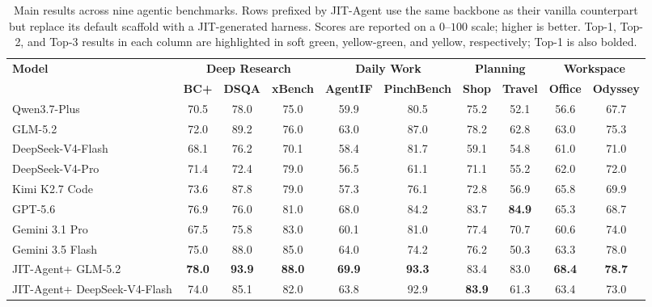\documentclass{article}
\newcommand{\ourmethod}{JIT-Agent\xspace}
\newcommand{\topone}[1]{\cellcolor{toponecell}\textbf{#1}}
\newcommand{\toptwo}[1]{\cellcolor{toptwocell}#1}
\newcommand{\topthree}[1]{\cellcolor{topthreecell}#1}
\begin{document}
\begin{table}[!t]
\centering
\setlength{\tabcolsep}{3.2pt}
\renewcommand{\arraystretch}{1.12}
\caption{Main results across nine agentic benchmarks. Rows prefixed by \ourmethod use the same backbone as their vanilla counterpart but replace its default scaffold with a JIT-generated harness. Scores are reported on a $0$--$100$ scale; higher is better. Top-1, Top-2, and Top-3 results in each column are highlighted in soft green, yellow-green, and yellow, respectively; Top-1 is also bolded.}
\label{tab:main_results_vanilla}
\begin{adjustbox}{max width=\textwidth}
\begin{tabular}{lccccccccc}
\toprule
\textbf{Model} & \multicolumn{3}{c}{\textbf{Deep Research}} & \multicolumn{2}{c}{\textbf{Daily Work}} & \multicolumn{2}{c}{\textbf{Planning}} & \multicolumn{2}{c}{\textbf{Workspace}} \\
\cmidrule(lr){2-4}\cmidrule(lr){5-6}\cmidrule(lr){7-8}\cmidrule(lr){9-10}
 & \textbf{BC+} & \textbf{DSQA} & \textbf{xBench} & \textbf{AgentIF} & \textbf{PinchBench} & \textbf{Shop} & \textbf{Travel} & \textbf{Office} & \textbf{Odyssey} \\
\midrule
Qwen3.7-Plus & 70.5 & 78.0& 75.0 & 59.9 & 80.5 & 75.2 & 52.1 & 56.6& 67.7\\
GLM-5.2 & 72.0 & \toptwo{89.2}& 76.0 & 63.0 & \topthree{87.0} & 78.2 & 62.8 & 63.0& \topthree{75.3}\\
DeepSeek-V4-Flash & 68.1 & 76.2 & 70.1 & 58.4 & 81.7 & 59.1 & 54.8 & 61.0 & 71.0 \\
DeepSeek-V4-Pro & 71.4 & 72.4& 79.0 & 56.5 & 61.1 & 71.1 & 55.2 & 62.0 & 72.0 \\
Kimi K2.7 Code & 73.6 & 87.8 & 79.0 & 57.3 & 76.1 & 72.8 & 56.9 & \toptwo{65.8}& 69.9 \\
GPT-5.6 &  \toptwo{76.9} & 76.0& 81.0 & \toptwo{68.0}& 84.2 & \toptwo{83.7} & \topone{84.9} & \topthree{65.3}& 68.7\\
Gemini 3.1 Pro & 67.5 & 75.8& \topthree{83.0} & 60.1& 81.0 & 77.4 & \topthree{70.7} & 60.6& 74.0\\
Gemini 3.5 Flash & \topthree{75.0} & \topthree{88.0}& \toptwo{85.0} & \topthree{64.0}& 74.2 & 76.2 & 50.3 & 63.3& \toptwo{78.0}\\
\midrule
\ourmethod + GLM-5.2 & \topone{78.0} & \topone{93.9}& \topone{88.0} & \topone{69.9} & \topone{93.3} & \topthree{83.4} & \toptwo{83.0} & \topone{68.4} & \topone{78.7} \\
\ourmethod + DeepSeek-V4-Flash & 74.0 & 85.1 & 82.0 & 63.8 & \toptwo{92.9} & \topone{83.9} & 61.3 & 63.4 & 73.0 \\
\bottomrule
\end{tabular}
\end{adjustbox}
\end{table}
\end{document}
